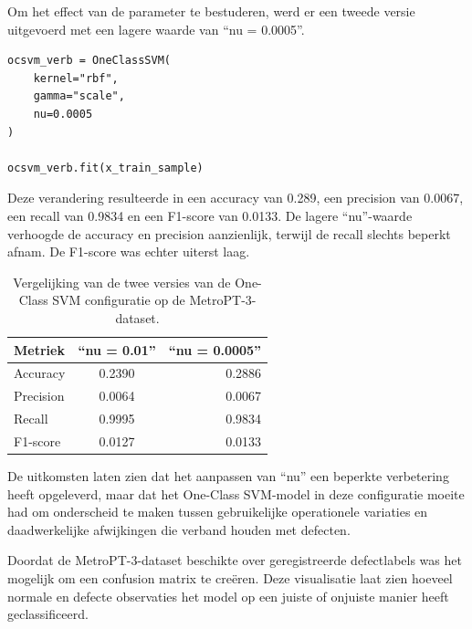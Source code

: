 {{{{{Om het effect van de parameter te bestuderen, werd er een tweede versie uitgevoerd met een lagere waarde van ``nu = 0.0005''.

\begin{listing}[H]
\begin{verbatim}
ocsvm_verb = OneClassSVM(
    kernel="rbf",
    gamma="scale",
    nu=0.0005
)

ocsvm_verb.fit(x_train_sample)
\end{verbatim}
\caption[Code snippet: tweede One-Class SVM configuratie met een lagere ``nu''-waarde]{Codefragment van de tweede One-Class SVM configuratie met een lagere ``nu''-waarde.}
\end{listing}

Deze verandering resulteerde in een accuracy van 0.289, een precision van 0.0067, een recall van 0.9834 en een F1-score van 0.0133. De lagere ``nu''-waarde verhoogde de accuracy en precision aanzienlijk, terwijl de recall slechts beperkt afnam. De F1-score was echter uiterst laag.

\begin{table}[H]
\centering
\begin{tabular}{lcr}
\toprule
\textbf{Metriek} & \textbf{``nu = 0.01''} & \textbf{``nu = 0.0005''} \\
\midrule
Accuracy                & 0.2390           & 0.2886 \\
Precision                & 0.0064          & 0.0067 \\
Recall & 0.9995 & 0.9834 \\
F1-score & 0.0127 & 0.0133 \\
\bottomrule
\end{tabular}
\caption[Tabel: vergelijking van de twee versies van de One-Class SVM configuratie op de MetroPT-3-dataset]{\label{tab:tabel_vergelijking_versies_One-Class_SVM}Vergelijking van de twee versies van de One-Class SVM configuratie op de MetroPT-3-dataset.}
\end{table}
    
De uitkomsten laten zien dat het aanpassen van ``nu'' een beperkte verbetering heeft opgeleverd, maar dat het One-Class SVM-model in deze configuratie moeite had om onderscheid te maken tussen gebruikelijke operationele variaties en daadwerkelijke afwijkingen die verband houden met defecten.

Doordat de MetroPT-3-dataset beschikte over geregistreerde defectlabels was het mogelijk om een confusion matrix te creëren. Deze visualisatie laat zien hoeveel normale en defecte observaties het model op een juiste of onjuiste manier heeft geclassificeerd.

}}}}}
